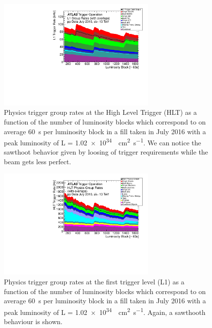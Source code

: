 \begin{figure}[pb]
\centering
\includegraphics[width=0.7\textwidth]{LHC_ATLAS/Time_L1GroupRate_Stack_2016_07}
\caption{Physics trigger group rates at the High Level Trigger (HLT) as a function of the number of luminosity blocks which correspond to on average \SI{60}{\s} per luminosity block in a fill taken in July 2016 with a peak luminosity of L = \SI{1.02 e34}{\per\cm\squared\per\s}. We can notice the sawthoot behavior given by loosing of trigger requirements while the beam gets less perfect.}
\label{fig:L1}
\end{figure}
\begin{figure}[pb]
\centering
\includegraphics[width=0.7\textwidth]{LHC_ATLAS/Time_HLTGroupRate_Stack_2016_07}
\caption{Physics trigger group rates at the first trigger level (L1) as a function of the number of luminosity blocks which correspond to on average \SI{60}{s} per luminosity block in a fill taken in July 2016 with a peak luminosity of L = \SI{1.02 e34}{\per\cm\squared\per\s}. Again, a sawthooth behaviour is shown.}
\label{fig:HLT}
\end{figure}





